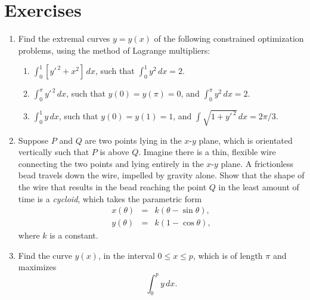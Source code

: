 \section{Exercises}
{\small 
\renewcommand{\theenumi}{D.\arabic{enumi}}
\begin{enumerate}
\item Find the extremal curves $y = y(x)$ of the following constrained optimization problems, using the method of Lagrange multipliers:
\begin{enumerate}
\item $\int_0^1\left[y'^{\,2}+x^2\right]\,dx$, such that $\int_0^1 y^2\,dx = 2$.
\item $\int_0^\pi y'^{\,2}\,dx$, such that $y(0)=y(\pi)=0$, and
$\int_0^\pi y^2 \,dx=2$. 
\item $\int_0^1y\,dx$, such that $y(0)=y(1)=1$, and
$\int\sqrt{1+y'^{\,2}}\,dx=2\pi/3$.
\end{enumerate}
\item Suppose $P$ and $Q$ are two points lying in the $x$-$y$ plane, which is orientated vertically such that $P$ is above $Q$. Imagine there is a thin, flexible wire connecting the two points and lying entirely in the $x$-$y$ plane. A frictionless bead travels down the wire, impelled by gravity alone. Show that the shape of the wire that results in the bead reaching the point $Q$ in the least amount of time is a {\em cycloid}, which takes the parametric form
\begin{eqnarray}
x(\theta)&=&k\left(\theta-\sin\theta\right),\nonumber\\[0.5ex]
y(\theta)&=&k \left(1-\cos\theta\right),\nonumber
\end{eqnarray}
where $k$ is a constant. 
\item Find the curve $y(x)$, in the interval $0\leq x\leq p$, which is of length $\pi$ and maximizes
$$
\int_0^p y\,dx.
$$
\end{enumerate}}


